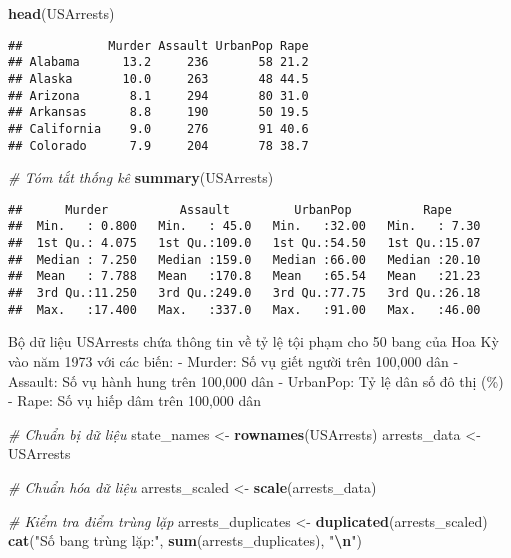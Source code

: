\documentclass[
]{article}
\newenvironment{Shaded}{\begin{snugshade}}{\end{snugshade}}
\newcommand{\CommentTok}[1]{\textcolor[rgb]{0.56,0.35,0.01}{\textit{#1}}}
\newcommand{\FunctionTok}[1]{\textcolor[rgb]{0.13,0.29,0.53}{\textbf{#1}}}
\newcommand{\NormalTok}[1]{#1}
\newcommand{\OtherTok}[1]{\textcolor[rgb]{0.56,0.35,0.01}{#1}}
\newcommand{\SpecialCharTok}[1]{\textcolor[rgb]{0.81,0.36,0.00}{\textbf{#1}}}
\newcommand{\StringTok}[1]{\textcolor[rgb]{0.31,0.60,0.02}{#1}}
\begin{document}
\begin{Shaded}
\begin{Highlighting}[]
\FunctionTok{head}\NormalTok{(USArrests)}
\end{Highlighting}
\end{Shaded}

\begin{verbatim}
##            Murder Assault UrbanPop Rape
## Alabama      13.2     236       58 21.2
## Alaska       10.0     263       48 44.5
## Arizona       8.1     294       80 31.0
## Arkansas      8.8     190       50 19.5
## California    9.0     276       91 40.6
## Colorado      7.9     204       78 38.7
\end{verbatim}

\begin{Shaded}
\begin{Highlighting}[]
\CommentTok{\# Tóm tắt thống kê}
\FunctionTok{summary}\NormalTok{(USArrests)}
\end{Highlighting}
\end{Shaded}

\begin{verbatim}
##      Murder          Assault         UrbanPop          Rape      
##  Min.   : 0.800   Min.   : 45.0   Min.   :32.00   Min.   : 7.30  
##  1st Qu.: 4.075   1st Qu.:109.0   1st Qu.:54.50   1st Qu.:15.07  
##  Median : 7.250   Median :159.0   Median :66.00   Median :20.10  
##  Mean   : 7.788   Mean   :170.8   Mean   :65.54   Mean   :21.23  
##  3rd Qu.:11.250   3rd Qu.:249.0   3rd Qu.:77.75   3rd Qu.:26.18  
##  Max.   :17.400   Max.   :337.0   Max.   :91.00   Max.   :46.00
\end{verbatim}

Bộ dữ liệu USArrests chứa thông tin về tỷ lệ tội phạm cho 50 bang của
Hoa Kỳ vào năm 1973 với các biến: - Murder: Số vụ giết người trên
100,000 dân - Assault: Số vụ hành hung trên 100,000 dân - UrbanPop: Tỷ
lệ dân số đô thị (\%) - Rape: Số vụ hiếp dâm trên 100,000 dân

\begin{Shaded}
\begin{Highlighting}[]
\CommentTok{\# Chuẩn bị dữ liệu}
\NormalTok{state\_names }\OtherTok{\textless{}{-}} \FunctionTok{rownames}\NormalTok{(USArrests)}
\NormalTok{arrests\_data }\OtherTok{\textless{}{-}}\NormalTok{ USArrests}

\CommentTok{\# Chuẩn hóa dữ liệu}
\NormalTok{arrests\_scaled }\OtherTok{\textless{}{-}} \FunctionTok{scale}\NormalTok{(arrests\_data)}

\CommentTok{\# Kiểm tra điểm trùng lặp}
\NormalTok{arrests\_duplicates }\OtherTok{\textless{}{-}} \FunctionTok{duplicated}\NormalTok{(arrests\_scaled)}
\FunctionTok{cat}\NormalTok{(}\StringTok{"Số bang trùng lặp:"}\NormalTok{, }\FunctionTok{sum}\NormalTok{(arrests\_duplicates), }\StringTok{"}\SpecialCharTok{\textbackslash{}n}\StringTok{"}\NormalTok{)}
\end{Highlighting}
\end{Shaded}
\end{document}
